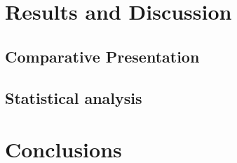 \documentclass[parskip=full]{scrartcl}
\begin{document}
\section{Results and Discussion}
\subsection{Comparative Presentation}
\subsection{Statistical analysis}

\section{Conclusions}



\end{document}
